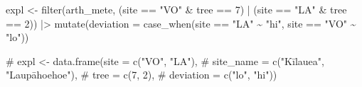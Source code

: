 \documentclass[
  letterpaper,
  DIV=11,
  numbers=noendperiod]{scrartcl}
\newenvironment{Shaded}{\begin{snugshade}}{\end{snugshade}}
\newcommand{\AttributeTok}[1]{\textcolor[rgb]{0.40,0.45,0.13}{#1}}
\newcommand{\CommentTok}[1]{\textcolor[rgb]{0.37,0.37,0.37}{#1}}
\newcommand{\DecValTok}[1]{\textcolor[rgb]{0.68,0.00,0.00}{#1}}
\newcommand{\FunctionTok}[1]{\textcolor[rgb]{0.28,0.35,0.67}{#1}}
\newcommand{\NormalTok}[1]{\textcolor[rgb]{0.00,0.23,0.31}{#1}}
\newcommand{\OtherTok}[1]{\textcolor[rgb]{0.00,0.23,0.31}{#1}}
\newcommand{\SpecialCharTok}[1]{\textcolor[rgb]{0.37,0.37,0.37}{#1}}
\newcommand{\StringTok}[1]{\textcolor[rgb]{0.13,0.47,0.30}{#1}}
\begin{document}
\begin{Shaded}
\begin{Highlighting}[]
\NormalTok{expl }\OtherTok{\textless{}{-}} \FunctionTok{filter}\NormalTok{(arth\_mete, }
\NormalTok{               (site }\SpecialCharTok{==} \StringTok{"VO"} \SpecialCharTok{\&}\NormalTok{ tree }\SpecialCharTok{==} \DecValTok{7}\NormalTok{) }\SpecialCharTok{|}\NormalTok{ (site }\SpecialCharTok{==} \StringTok{"LA"} \SpecialCharTok{\&}\NormalTok{ tree }\SpecialCharTok{==} \DecValTok{2}\NormalTok{)) }\SpecialCharTok{|\textgreater{}} 
    \FunctionTok{mutate}\NormalTok{(}\AttributeTok{deviation =} \FunctionTok{case\_when}\NormalTok{(site }\SpecialCharTok{==} \StringTok{"LA"} \SpecialCharTok{\textasciitilde{}} \StringTok{"hi"}\NormalTok{, }
\NormalTok{                                 site }\SpecialCharTok{==} \StringTok{"VO"} \SpecialCharTok{\textasciitilde{}} \StringTok{"lo"}\NormalTok{))}

\CommentTok{\# expl \textless{}{-} data.frame(site = c("VO", "LA"), }
\CommentTok{\#                    site\_name = c("Kīlauea", "Laupāhoehoe"),}
\CommentTok{\#                    tree = c(7, 2), }
\CommentTok{\#                    deviation = c("lo", "hi"))}


\end{Highlighting}
\end{Shaded}
\end{document}
